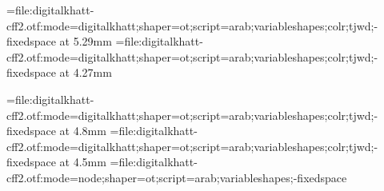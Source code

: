 \edef\pdfcompresslevel{\pdfvariable compresslevel}
\edef\pdfobjcompresslevel{\pdfvariable objcompresslevel}
\edef\pdfgentounicode{\pdfvariable gentounicode}
\newbox\ayaframe
\newcount\suranum


\def\suraline#1{%
\global\advance\suranum by1%
\leavevmode\raise1.2em\hbox to 0pt{\pdfbookmark{\the\suranum. #1}{sura\the\suranum}}%
\hbox to 0pt{\copy\ayaframe\hss}\centerline{\medinasura\textdir TRT#1}%
}%
\def\bismline#1{\centerline{\medinasura\textdir TRT#1}}



\def\sajdabar#1{\setattribute{\sajdaatt}{1}#1\unsetattribute{\sajdaatt}\directlua{addsajdacallback()}%
}

\newdimen\scaledsize 
{}\textwidth%

\font\medinafontvar={file:digitalkhatt-cff2.otf:mode=digitalkhatt;shaper=ot;script=arab;variableshapes;colr;tjwd;-fixedspace} at 5.29mm %
\font\medinafontvarmadina={file:digitalkhatt-cff2.otf:mode=digitalkhatt;shaper=ot;script=arab;variableshapes;colr;tjwd;-fixedspace} at 4.27mm


\font\medinasura={file:digitalkhatt-cff2.otf:mode=digitalkhatt;shaper=ot;script=arab;variableshapes;colr;tjwd;-fixedspace} at 4.8mm
\font\fatiha={file:digitalkhatt-cff2.otf:mode=digitalkhatt;shaper=ot;script=arab;variableshapes;colr;tjwd;-fixedspace} at 4.5mm
\font\medinafontvarnode={file:digitalkhatt-cff2.otf:mode=node;shaper=ot;script=arab;variableshapes;-fixedspace}

\renewcommand{\baselinestretch}{2.25}
\lineskiplimit=-100pt

\parindent=0pt
\parfillskip=0pt

\def\topglue{\nointerlineskip \vglue-\topskip \vglue}

\def\ayagraphic{\centerline{\lower1em\hbox{\texttt{[image: ayaframe.pdf]}}}}


